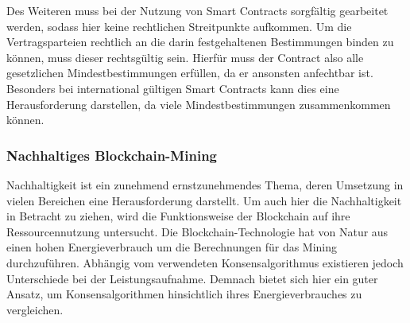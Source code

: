 Des Weiteren muss bei der Nutzung von Smart Contracts sorgfältig gearbeitet werden, sodass hier keine 
rechtlichen Streitpunkte aufkommen. Um die Vertragsparteien rechtlich an die darin festgehaltenen
Bestimmungen binden zu können, muss dieser rechtsgültig sein. Hierfür muss der Contract also alle 
gesetzlichen Mindestbestimmungen erfüllen, da er ansonsten anfechtbar ist. Besonders bei international
gültigen Smart Contracts kann dies eine Herausforderung darstellen, da viele Mindestbestimmungen
zusammenkommen können.
\cite[p.~14]{pirafelnerblockchaintechnologie}



\subsubsection{Nachhaltiges Blockchain-Mining}
Nachhaltigkeit ist ein zunehmend ernstzunehmendes Thema, deren Umsetzung in vielen Bereichen eine 
Herausforderung darstellt. Um auch hier die Nachhaltigkeit in Betracht zu ziehen, wird die 
Funktionsweise der Blockchain auf ihre Ressourcennutzung untersucht. 
Die Blockchain-Technologie hat von Natur aus einen hohen Energieverbrauch um die Berechnungen für das 
Mining durchzuführen. Abhängig vom verwendeten Konsensalgorithmus existieren jedoch Unterschiede bei 
der Leistungsaufnahme. 
\cite[p.~2]{Athar2024BC_Sustainability}
Demnach bietet sich hier ein guter Ansatz, um Konsensalgorithmen hinsichtlich ihres Energieverbrauches
zu vergleichen.

